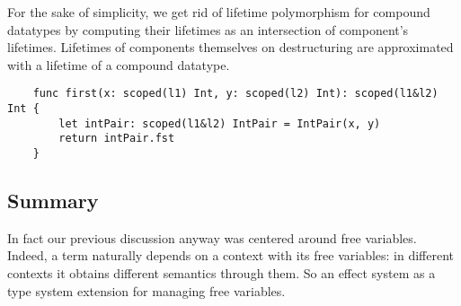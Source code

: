 \documentclass[acmsmall]{acmart}
\begin{document}
For the sake of simplicity, we get rid of lifetime polymorphism for compound datatypes by computing their lifetimes as an intersection of component's lifetimes.
Lifetimes of components themselves on destructuring are approximated with a lifetime of a compound datatype.
\begin{verbatim}
    func first(x: scoped(l1) Int, y: scoped(l2) Int): scoped(l1&l2) Int {
        let intPair: scoped(l1&l2) IntPair = IntPair(x, y)
        return intPair.fst
    }
\end{verbatim}



%








\subsection{Summary} \label{subsec:idea-summary}

In fact our previous discussion anyway was centered around free variables.
Indeed, a term naturally depends on a context with its free variables: in different contexts it obtains different semantics through them.
So an effect system as a type system extension for managing free variables.
\end{document}
